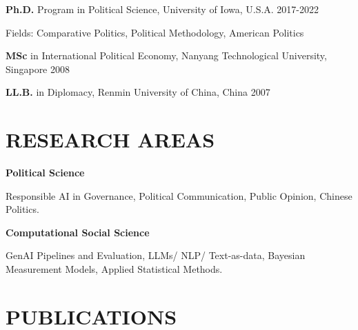 \documentclass[10.5pt,]{article}
\providecommand{\tightlist}{%
	\setlength{\itemsep}{0pt}\setlength{\parskip}{0pt}}
\renewenvironment{itemize}{
	\begin{list}{}{
			\setlength{\leftmargin}{1.5em}
		}
	}{
	\end{list}
}
\begin{document}
\begin{itemize}
\tightlist
\item
  \textbf{Ph.D.} Program in Political Science, University of Iowa,
  U.S.A. \hfill 2017-2022

  \begin{itemize}
  \tightlist
  \item
    Fields: Comparative Politics, Political Methodology, American
    Politics
  \end{itemize}
\item
  \textbf{MSc} in International Political Economy, Nanyang Technological
  University, Singapore \hfill 2008
\item
  \textbf{LL.B.} in Diplomacy, Renmin University of China, China
  \hfill 2007
\end{itemize}

\section{RESEARCH AREAS}\label{research-areas}

\begin{itemize}
\tightlist
\item
  \textbf{Political Science}

  \begin{itemize}
  \tightlist
  \item
    Responsible AI in Governance, Political Communication, Public
    Opinion, Chinese Politics.
  \end{itemize}
\item
  \textbf{Computational Social Science}

  \begin{itemize}
  \tightlist
  \item
    GenAI Pipelines and Evaluation, LLMs/ NLP/ Text-as-data, Bayesian
    Measurement Models, Applied Statistical Methods.
  \end{itemize}
\end{itemize}

\section{PUBLICATIONS}\label{publications}
\end{document}
